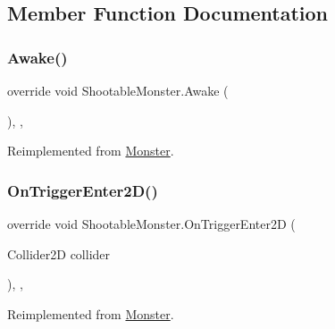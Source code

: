 \subsection{Member Function Documentation}
\mbox{\label{class_shootable_monster_adfb9638b7a397563df4ab94c2db20ec0}} 
\subsubsection{\texorpdfstring{Awake()}{Awake()}}
{\footnotesize\ttfamily override void Shootable\+Monster.\+Awake (\begin{DoxyParamCaption}{ }\end{DoxyParamCaption})\hspace{0.3cm}{\ttfamily [inline]}, {\ttfamily [protected]}, {\ttfamily [virtual]}}



Reimplemented from \mbox{\hyperlink{class_monster_a3ccbdc33e8e7e6fb20286338ad17c6f2}{Monster}}.

\mbox{\label{class_shootable_monster_a6c350a976d1bb37db2c663834c90e83b}} 
\subsubsection{\texorpdfstring{On\+Trigger\+Enter2\+D()}{OnTriggerEnter2D()}}
{\footnotesize\ttfamily override void Shootable\+Monster.\+On\+Trigger\+Enter2D (\begin{DoxyParamCaption}\item[{Collider2D}]{collider }\end{DoxyParamCaption})\hspace{0.3cm}{\ttfamily [inline]}, {\ttfamily [protected]}, {\ttfamily [virtual]}}



Reimplemented from \mbox{\hyperlink{class_monster_af6ac6a4c01088e6b4abf79da772cecff}{Monster}}.

\mbox{\label{class_shootable_monster_a0e26de95298ec75a591ecede3c1d8cb9}} 
